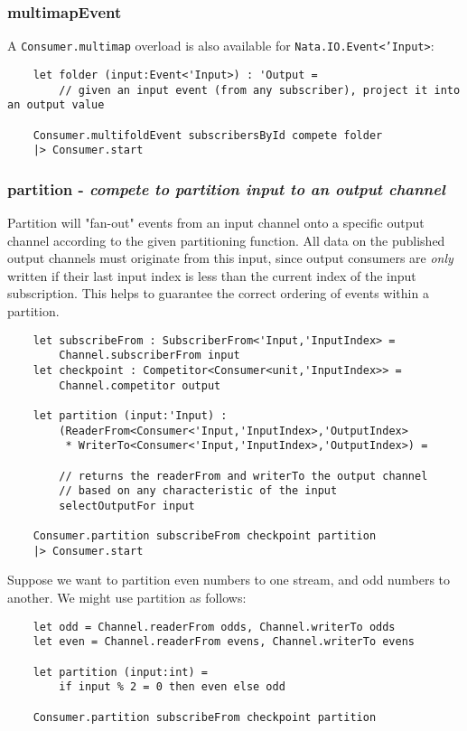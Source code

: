 \documentclass{article}
\begin{document}
\subsubsection{multimapEvent}

A \texttt{Consumer.multimap} overload is also available for \texttt{Nata.IO.Event<'Input>}:

\begin{verbatim}
    let folder (input:Event<'Input>) : 'Output =
        // given an input event (from any subscriber), project it into an output value

    Consumer.multifoldEvent subscribersById compete folder
    |> Consumer.start
\end{verbatim}

\subsubsection{partition - \textit{compete to partition input to an output channel}}

Partition will "fan-out" events from an input channel onto a specific output channel according to the given partitioning function.  All data on the published output channels must originate from this input, since output consumers are \textit{only} written if their last input index is less than the current index of the input subscription.  This helps to guarantee the correct ordering of events within a partition.

\begin{verbatim}
    let subscribeFrom : SubscriberFrom<'Input,'InputIndex> =
        Channel.subscriberFrom input
    let checkpoint : Competitor<Consumer<unit,'InputIndex>> =
        Channel.competitor output
    
    let partition (input:'Input) :
        (ReaderFrom<Consumer<'Input,'InputIndex>,'OutputIndex>
         * WriterTo<Consumer<'Input,'InputIndex>,'OutputIndex>) =
        
        // returns the readerFrom and writerTo the output channel
        // based on any characteristic of the input
        selectOutputFor input
        
    Consumer.partition subscribeFrom checkpoint partition
    |> Consumer.start
\end{verbatim}

Suppose we want to partition even numbers to one stream, and odd numbers to another.  We might use partition as follows:

\begin{verbatim}
    let odd = Channel.readerFrom odds, Channel.writerTo odds
    let even = Channel.readerFrom evens, Channel.writerTo evens
        
    let partition (input:int) =
        if input % 2 = 0 then even else odd
        
    Consumer.partition subscribeFrom checkpoint partition
\end{verbatim}
\end{document}
